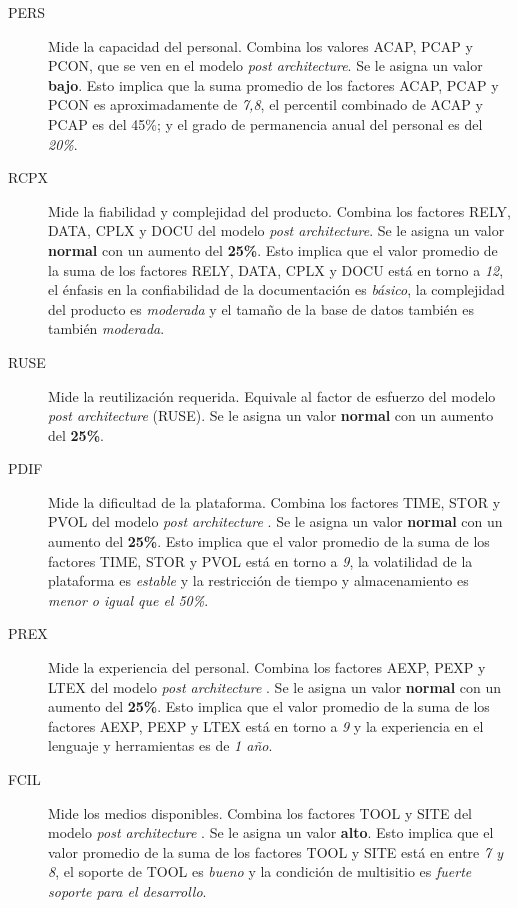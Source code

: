 \documentclass[11pt,a4paper,spanish,twoside]{report}
\begin{document}
\begin{description}
\item[PERS] Mide la capacidad del personal. Combina los valores ACAP, PCAP y
PCON, que se ven en el modelo \emph{post architecture}. Se le asigna un
valor \textbf{bajo}. Esto implica que la suma promedio de los factores
ACAP, PCAP y PCON es aproximadamente de \emph{7,8}, el percentil combinado
de ACAP y PCAP es del 45\%; y el grado de permanencia anual del personal es
del \emph{20\%}.

\item[RCPX] Mide la fiabilidad y complejidad del producto. Combina los
factores RELY, DATA, CPLX y DOCU del modelo \emph{post architecture}. Se le
asigna un valor \textbf{normal} con un aumento del \textbf{25\%}. Esto
implica que el valor promedio de la suma de los factores RELY, DATA, CPLX y
DOCU está en torno a \emph{12}, el énfasis en la confiabilidad de la
documentación es \emph{básico}, la complejidad del producto es
\emph{moderada} y el tamaño de la base de datos también es también
\emph{moderada}.

\item[RUSE] Mide la reutilización requerida. Equivale al factor de esfuerzo
del modelo \emph{post architecture} (RUSE). Se le asigna un valor
\textbf{normal} con un aumento del \textbf{25\%}.

\item[PDIF] Mide la dificultad de la plataforma. Combina los factores TIME, 
STOR y PVOL del modelo \emph{post architecture} . Se le asigna un valor
\textbf{normal} con un aumento del \textbf{25\%}. Esto implica que el valor 
promedio de la suma de los factores TIME, STOR y PVOL está en torno a \emph{9},
la volatilidad de la plataforma es \emph{estable} y la restricción de tiempo y
almacenamiento es \emph{menor o igual que el 50\%}.

\item[PREX] Mide la experiencia del personal. Combina los factores AEXP, PEXP y
LTEX del modelo \emph{post architecture} . Se le asigna un valor 
\textbf{normal} con un aumento del \textbf{25\%}. Esto implica que el valor 
promedio de la suma de los factores AEXP, PEXP y LTEX está en torno a \emph{9}
y la experiencia en el lenguaje y herramientas es de \emph{1 año}.

\item[FCIL] Mide los medios disponibles. Combina los factores TOOL y SITE del 
modelo \emph{post architecture} . Se le asigna un valor \textbf{alto}. Esto 
implica que el valor promedio de la suma de los factores TOOL y SITE está en 
entre \emph{7 y 8}, el soporte de TOOL es \emph{bueno} y la condición de 
multisitio es \emph{fuerte soporte para el desarrollo}.

\end{description}
\end{document}
